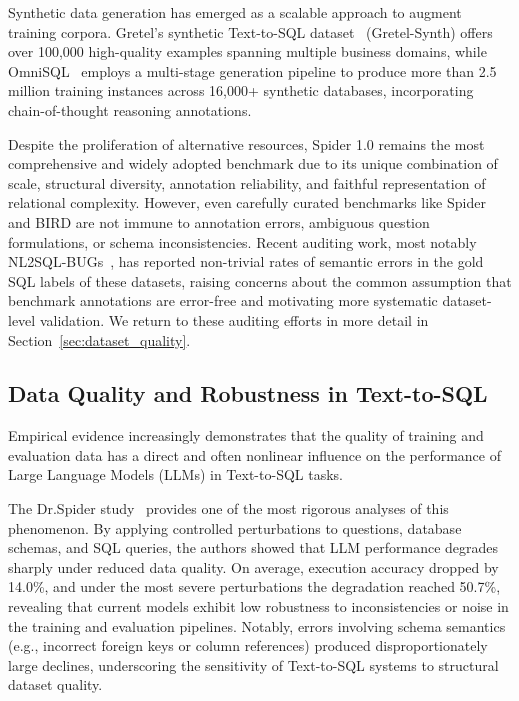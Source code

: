 \documentclass[]{einformatica}
\begin{document}
Synthetic data generation has emerged as a scalable approach to augment training corpora. Gretel's synthetic Text-to-SQL dataset~\cite{gretelSynthDataset} (Gretel-Synth) offers over 100,000 high-quality examples spanning multiple business domains, while OmniSQL~\cite{li2025omnisql} employs a multi-stage generation pipeline to produce more than 2.5 million training instances across 16,000+ synthetic databases, incorporating chain-of-thought reasoning annotations. 

Despite the proliferation of alternative resources, Spider 1.0 remains the most comprehensive and widely adopted benchmark due to its unique combination of scale, structural diversity, annotation reliability, and faithful representation of relational complexity. However, even carefully curated benchmarks like Spider and BIRD are not immune to annotation errors, ambiguous question formulations, or schema inconsistencies. Recent auditing work, most notably NL2SQL-BUGs~\cite{liu2025nl2sqlbugs}, has reported non-trivial rates of semantic errors in the gold SQL labels of these datasets, raising concerns about the common assumption that benchmark annotations are error-free and motivating more systematic dataset-level validation. We return to these auditing efforts in more detail in Section~\ref{sec:dataset_quality}.

\subsection{Data Quality and Robustness in Text-to-SQL}\label{sec:data_quality_robustness}

Empirical evidence increasingly demonstrates that the quality of training and evaluation data has a direct and often nonlinear influence on the performance of Large Language Models (LLMs) in Text-to-SQL tasks. 

The Dr.Spider study~\cite{chang2023drspider} provides one of the most rigorous analyses of this phenomenon. By applying controlled perturbations to questions, database schemas, and SQL queries, the authors showed that LLM performance degrades sharply under reduced data quality. On average, execution accuracy dropped by 14.0\%, and under the most severe perturbations the degradation reached 50.7\%, revealing that current models exhibit low robustness to inconsistencies or noise in the training and evaluation pipelines. Notably, errors involving schema semantics (e.g., incorrect foreign keys or column references) produced disproportionately large declines, underscoring the sensitivity of Text-to-SQL systems to structural dataset quality.
\end{document}
